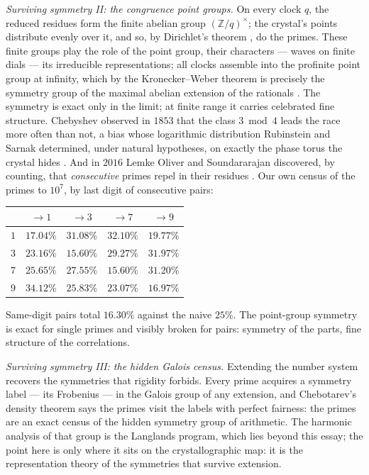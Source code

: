 \documentclass[11pt]{article}
\theoremstyle{remark}
\begin{document}
\emph{Surviving symmetry II: the congruence point groups.} On every clock $q$, the reduced residues
form the finite abelian group $(\mathbb{Z}/q)^{\times}$; the crystal's points distribute evenly over
it, and so, by Dirichlet's theorem \cite{Dirichlet}, do the primes. These finite groups play the role
of the point group, their characters --- waves on finite dials --- its irreducible representations;
all clocks assemble into the profinite point group at infinity, which by the Kronecker--Weber theorem
is precisely the symmetry group of the maximal abelian extension of the rationals \cite{Lang}. The
symmetry is exact only in the limit; at finite range it carries celebrated fine structure. Chebyshev
observed in $1853$ that the class $3 \bmod 4$ leads the race more often than not, a bias whose
logarithmic distribution Rubinstein and Sarnak determined, under natural hypotheses, on exactly the
phase torus the crystal hides \cite{RubinsteinSarnak}. And in $2016$ Lemke Oliver and Soundararajan
discovered, by counting, that \emph{consecutive} primes repel in their residues \cite{LOS}. Our own
census of the primes to $10^7$, by last digit of consecutive pairs:

\begin{center}
\begin{tabular}{c|cccc}
 & $\to 1$ & $\to 3$ & $\to 7$ & $\to 9$ \\
\hline
$1$ & $17.04\%$ & $31.08\%$ & $32.10\%$ & $19.77\%$ \\
$3$ & $23.16\%$ & $15.60\%$ & $29.27\%$ & $31.97\%$ \\
$7$ & $25.65\%$ & $27.55\%$ & $15.60\%$ & $31.20\%$ \\
$9$ & $34.12\%$ & $25.83\%$ & $23.07\%$ & $16.97\%$ \\
\end{tabular}
\end{center}

\noindent Same-digit pairs total $16.30\%$ against the naive $25\%$. The point-group symmetry is
exact for single primes and visibly broken for pairs: symmetry of the parts, fine structure of the
correlations.

\emph{Surviving symmetry III: the hidden Galois census.} Extending the number system recovers the
symmetries that rigidity forbids. Every prime acquires a symmetry label --- its Frobenius --- in the
Galois group of any extension, and Chebotarev's density theorem \cite{Lang} says the primes visit the
labels with perfect fairness: the primes are an exact census of the hidden symmetry group of
arithmetic. The harmonic analysis of that group is the Langlands program, which lies beyond this
essay; the point here is only where it sits on the crystallographic map: it is the representation
theory of the symmetries that survive extension.
\end{document}
